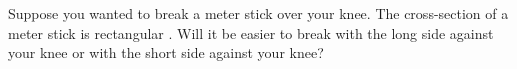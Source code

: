 \label{fnt7.3.1-5}

Suppose you wanted to break a meter stick over your knee.  The cross-section of a meter stick is rectangular    .  Will it be easier to break with the long side against your knee or with the short side against your knee?